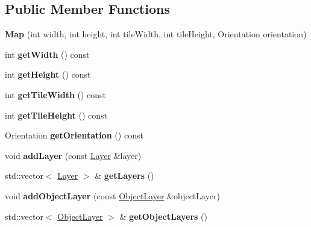 \subsection*{Public Member Functions}
\begin{DoxyCompactItemize}
\item 
\mbox{\label{classzt_1_1tiled_1_1_map_aea345c396798c0325610d6d3719bd4ca}} 
{\bfseries Map} (int width, int height, int tile\+Width, int tile\+Height, Orientation orientation)
\item 
\mbox{\label{classzt_1_1tiled_1_1_map_ab159d99e9fa5c9665e641ecddc69849d}} 
int {\bfseries get\+Width} () const
\item 
\mbox{\label{classzt_1_1tiled_1_1_map_a97c432d47f009bd961c39ff24a0aec32}} 
int {\bfseries get\+Height} () const
\item 
\mbox{\label{classzt_1_1tiled_1_1_map_a318c7fab2dd0054662b5743a99a5b183}} 
int {\bfseries get\+Tile\+Width} () const
\item 
\mbox{\label{classzt_1_1tiled_1_1_map_a8317f25e7c01eeba26929bab350a6f61}} 
int {\bfseries get\+Tile\+Height} () const
\item 
\mbox{\label{classzt_1_1tiled_1_1_map_abeae78f4a66d89e7c458d9b842de01b7}} 
Orientation {\bfseries get\+Orientation} () const
\item 
\mbox{\label{classzt_1_1tiled_1_1_map_ab0cd802b94079f5322ad8584fe22ae91}} 
void {\bfseries add\+Layer} (const \hyperlink{classzt_1_1tiled_1_1_layer}{Layer} \&layer)
\item 
\mbox{\label{classzt_1_1tiled_1_1_map_ab5735ce37acd2c58f7aa855e97123258}} 
std\+::vector$<$ \hyperlink{classzt_1_1tiled_1_1_layer}{Layer} $>$ \& {\bfseries get\+Layers} ()
\item 
\mbox{\label{classzt_1_1tiled_1_1_map_a4061885e6af9816c053da0415bb6be48}} 
void {\bfseries add\+Object\+Layer} (const \hyperlink{classzt_1_1tiled_1_1_object_layer}{Object\+Layer} \&object\+Layer)
\item 
\mbox{\label{classzt_1_1tiled_1_1_map_abe765796c91b94dfa089ef7547015582}} 
std\+::vector$<$ \hyperlink{classzt_1_1tiled_1_1_object_layer}{Object\+Layer} $>$ \& {\bfseries get\+Object\+Layers} ()
\end{DoxyCompactItemize}
